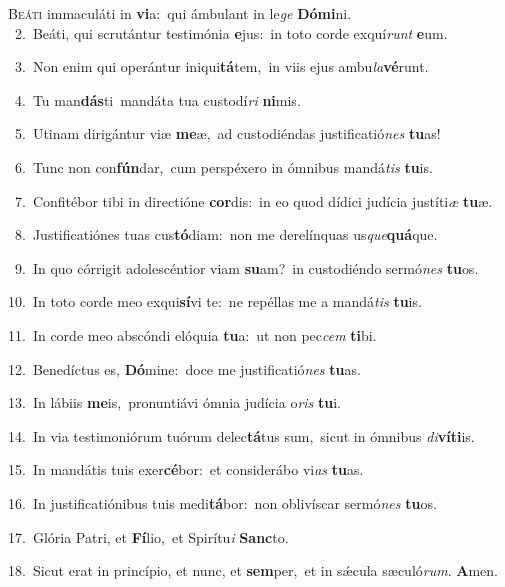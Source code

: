 \lettrine{\initial\textcolor{\initialcolor}{B}}{eáti} immaculáti in \textbf{vi}\-a:~\star qui ámbulant in le\textit{ge} \textbf{Dó}\-\textbf{mi}ni.\\
{\numbfont\textcolor{\numbcolor}{~2.}}~Beáti, qui scrutántur testimónia \textbf{e}\-jus:~\star in toto corde exquí\textit{runt} \textbf{e}\-um.\par
{\numbfont\textcolor{\numbcolor}{~3.}}~Non enim qui operántur iniqui\-\textbf{tá}\-tem,~\star in viis ejus ambu\-\textit{la}\-\textbf{vé}runt.\par
{\numbfont\textcolor{\numbcolor}{~4.}}~Tu man\-\textbf{dás}\-ti~\star mandáta tua custodí\textit{ri} \textbf{ni}\-mis.\par
{\numbfont\textcolor{\numbcolor}{~5.}}~Utinam dirigántur viæ \textbf{me}\-æ,~\star ad custodiéndas justificatió\textit{nes} \textbf{tu}\-as!\par
{\numbfont\textcolor{\numbcolor}{~6.}}~Tunc non con\-\textbf{fún}\-dar,~\star cum perspéxero in ómnibus mandá\textit{tis} \textbf{tu}\-is.\par
{\numbfont\textcolor{\numbcolor}{~7.}}~Confitébor tibi in directióne \textbf{cor}\-dis:~\star in eo quod dídici judícia justíti\textit{æ} \textbf{tu}\-æ.\par
{\numbfont\textcolor{\numbcolor}{~8.}}~Justificatiónes tuas cus\-\textbf{tó}\-diam:~\star non me derelínquas us\-\textit{que}\-\textbf{quá}que.\par
{\numbfont\textcolor{\numbcolor}{~9.}}~In quo córrigit adolescéntior viam \textbf{su}\-am?~\star in custodiéndo sermó\textit{nes} \textbf{tu}\-os.\par
{\numbfont\textcolor{\numbcolor}{10.}}~In toto corde meo exqui\-\textbf{sí}\-vi te:~\star ne repéllas me a mandá\textit{tis} \textbf{tu}\-is.\par
{\numbfont\textcolor{\numbcolor}{11.}}~In corde meo abscóndi elóquia \textbf{tu}\-a:~\star ut non pec\textit{cem} \textbf{ti}\-bi.\par
{\numbfont\textcolor{\numbcolor}{12.}}~Benedíctus es, \textbf{Dó}\-mine:~\star doce me justificatió\textit{nes} \textbf{tu}\-as.\par
{\numbfont\textcolor{\numbcolor}{13.}}~In lábiis \textbf{me}\-is,~\star pronuntiávi ómnia judícia o\textit{ris} \textbf{tu}\-i.\par
{\numbfont\textcolor{\numbcolor}{14.}}~In via testimoniórum tuórum delec\-\textbf{tá}\-tus sum,~\star sicut in ómnibus \textit{di}\-\textbf{ví}\textbf{ti}is.\par
{\numbfont\textcolor{\numbcolor}{15.}}~In mandátis tuis exer\-\textbf{cé}\-bor:~\star et considerábo vi\textit{as} \textbf{tu}\-as.\par
{\numbfont\textcolor{\numbcolor}{16.}}~In justificatiónibus tuis medi\-\textbf{tá}\-bor:~\star non oblivíscar sermó\textit{nes} \textbf{tu}\-os.\par
{\numbfont\textcolor{\numbcolor}{17.}}~Glória Patri, et \textbf{Fí}\-lio,~\star et Spirítu\textit{i} \textbf{Sanc}\-to.\par
{\numbfont\textcolor{\numbcolor}{18.}}~Sicut erat in princípio, et nunc, et \textbf{sem}\-per,~\star et in sǽcula sæculó\-\textit{rum}\-. \textbf{A}\-men.\par
